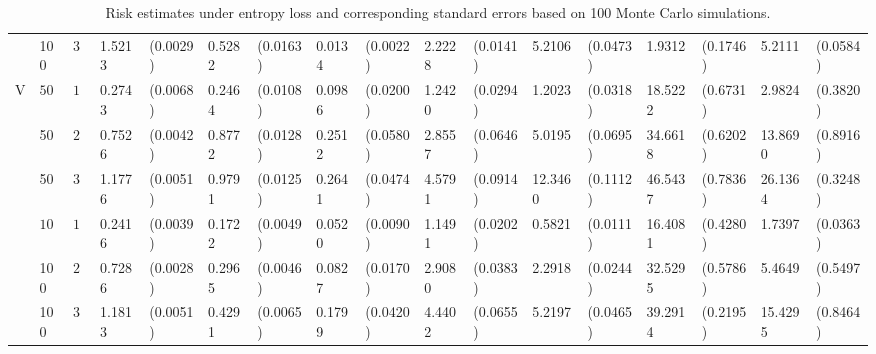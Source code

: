 \begin{table}[H]
\begin{footnotesize}
\begin{tabular}{lllllllllllllllll}
    & 100  & $30$ & 1.5213 & (0.0029) & 0.5282 & (0.0163) & 0.0134 & (0.0022) & 2.2228 & (0.0141) & 5.2106 & (0.0473) & 1.9312 & (0.1746) & 5.2111 & (0.0584) \\ 
  V & $50$ & $10$ & 0.2743 & (0.0068) & 0.2464 & (0.0108) & 0.0986 & (0.0200) & 1.2420 & (0.0294) & 1.2023 & (0.0318) & 18.5222 & (0.6731) & 2.9824 & (0.3820) \\ 
    &  50 & $20$ & 0.7526 & (0.0042) & 0.8772 & (0.0128) & 0.2512 & (0.0580) & 2.8557 & (0.0646) & 5.0195 & (0.0695) & 34.6618 & (0.6202) & 13.8690 & (0.8916) \\ 
    & 50  & $30$ & 1.1776 & (0.0051) & 0.9791 & (0.0125) & 0.2641 & (0.0474) & 4.5791 & (0.0914) & 12.3460 & (0.1112) & 46.5437 & (0.7836) & 26.1364 & (0.3248) \\ 
    & $100$ & $10$ & 0.2416 & (0.0039) & 0.1722 & (0.0049) & 0.0520 & (0.0090) & 1.1491 & (0.0202) & 0.5821 & (0.0111) & 16.4081 & (0.4280) & 1.7397 & (0.0363) \\ 
    &  100 & $20$ & 0.7286 & (0.0028) & 0.2965 & (0.0046) & 0.0827 & (0.0170) & 2.9080 & (0.0383) & 2.2918 & (0.0244) & 32.5295 & (0.5786) & 5.4649 & (0.5497) \\ 
    & 100  & $30$ & 1.1813 & (0.0051) & 0.4291 & (0.0065) & 0.1799 & (0.0420) & 4.4402 & (0.0655) & 5.2197 & (0.0465) & 39.2914 & (0.2195) & 15.4295 & (0.8464) \\ 
   \hline
\end{tabular}
\end{footnotesize}
\caption{Risk estimates under entropy loss and corresponding standard errors based on
                              100 Monte Carlo simulations.} \label{table:master-entropy-risk-table}
\end{table}

